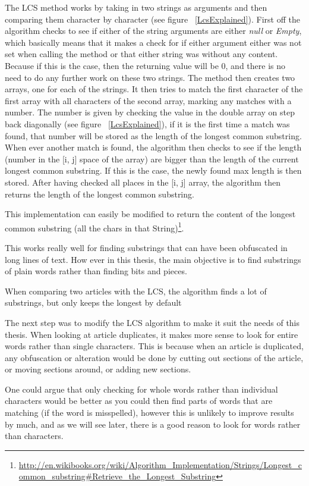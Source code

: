 The LCS method works by taking in two strings as arguments and then comparing them character by character (see figure ~\ref{LcsExplained}). First off the algorithm checks to see if either of the string arguments are either \textit{null} or \textit{Empty}, which basically means that it makes a check for if either argument either was not set when calling the method or that either string was without any content. Because if this is the case, then the returning value will be 0, and there is no need to do any further work on these two strings. The method then creates two arrays, one for each of the strings. It then tries to match the first character of the first array with all characters of the second array, marking any matches with a number. The number is given by checking the value in the double array on step back diagonally (see figure ~\ref{LcsExplained}), if it is the first time a match was found, that number will be stored as the length of the longest common substring. When ever another match is found, the algorithm then checks to see if the length (number in the [i, j] space of the array) are bigger than the length of the current longest common substring. If this is the case, the newly found max length is then stored. After having checked all places in the [i, j] array, the algorithm then returns the length of the longest common substring.

This implementation can easily be modified to return the content of the longest common substring (all the chars in that String)\footnote{\url{http://en.wikibooks.org/wiki/Algorithm_Implementation/Strings/Longest_common_substring\#Retrieve_the_Longest_Substring}}.

This works really well for finding substrings that can have been obfuscated in long lines of text. How ever in this thesis, the main objective is to find substrings of plain words rather than finding bits and pieces.

When comparing two articles with the LCS, the algorithm finds a lot of substrings, but only keeps the longest by default

The next step was to modify the LCS algorithm to make it suit the needs of this thesis. When looking at article duplicates, it makes more sense to look for entire words rather than single characters. This is because when an article is duplicated, any obfuscation or alteration would be done by cutting out sections of the article, or moving sections around, or adding new sections. 

One could argue that only checking for whole words rather than individual characters would be better as you could then find parts of words that are matching (if the word is misspelled), however this is unlikely to improve results by much, and as we will see later, there is a good reason to look for words rather than characters.

